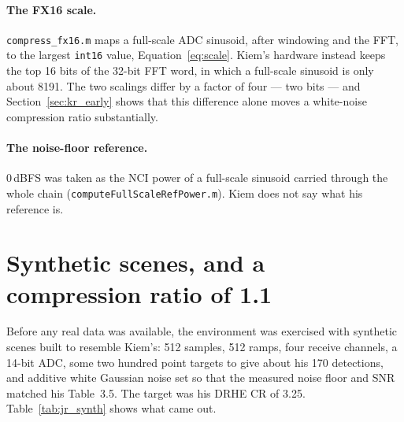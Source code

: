 \paragraph{The FX16 scale.} \texttt{compress\_fx16.m} maps a full-scale ADC
sinusoid, after windowing and the FFT, to the largest \texttt{int16} value,
Equation~\eqref{eq:scale}. Kiem's hardware instead keeps the top 16 bits of the
32-bit FFT word, in which a full-scale sinusoid is only about 8191. The two
scalings differ by a factor of four --- two bits --- and
Section~\ref{sec:kr_early} shows that this difference alone moves a white-noise
compression ratio substantially.

\paragraph{The noise-floor reference.} 0\,dBFS was taken as the NCI power of
a full-scale sinusoid carried through the whole chain
(\texttt{computeFullScaleRefPower.m}). Kiem does not say what his reference is.

\section{Synthetic scenes, and a compression ratio of 1.1}
\label{sec:jr_synth}

Before any real data was available, the environment was exercised with
synthetic scenes built to resemble Kiem's: 512 samples, 512 ramps, four
receive channels, a 14-bit ADC, some two hundred point targets to give about
his 170 detections, and additive white Gaussian noise set so that the measured
noise floor and SNR matched his Table~3.5. The target was his DRHE CR of 3.25.
Table~\ref{tab:jr_synth} shows what came out.

